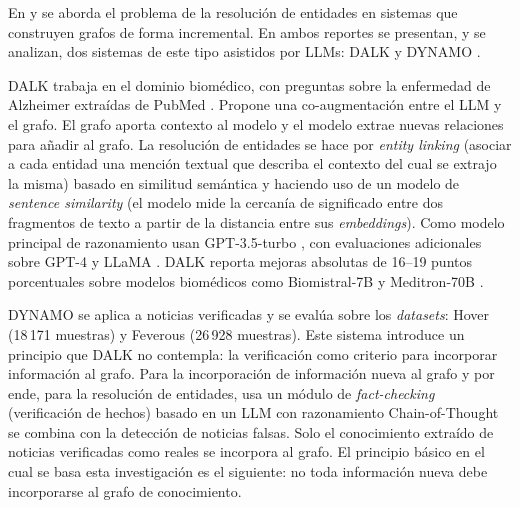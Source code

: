En \cite{dalk2024} y \cite{dynamo2025} se aborda el problema de la resolución de entidades en sistemas que construyen grafos de forma incremental. En ambos reportes se presentan, y se analizan, dos sistemas de este tipo asistidos por LLMs: DALK \cite{dalk2024} y DYNAMO \cite{dynamo2025}.

DALK trabaja en el dominio biomédico, con preguntas sobre la enfermedad de Alzheimer extraídas de PubMed \cite{pubmed}. Propone una co-augmentación entre el LLM y el grafo. El grafo aporta contexto al modelo y el modelo extrae nuevas relaciones para añadir al grafo. La resolución de entidades se hace por \emph{entity linking} \cite{sevgili2022neural} (asociar a cada entidad una mención textual que describa el contexto del cual se extrajo la misma) basado en similitud semántica y haciendo uso de un modelo de \emph{sentence similarity} \cite{reimers2019sbert} (el modelo mide la cercanía de significado entre dos fragmentos de texto a partir de la distancia entre sus \emph{embeddings}). Como modelo principal de razonamiento usan GPT-3.5-turbo \cite{openai2023gpt4}, con evaluaciones adicionales sobre GPT-4 \cite{openai2023gpt4} y LLaMA \cite{llama3_2024}. DALK reporta mejoras absolutas de 16--19 puntos porcentuales sobre modelos biomédicos como Biomistral-7B \cite{labrak2024biomistral} y Meditron-70B \cite{chen2023meditron}.

DYNAMO se aplica a noticias verificadas y se evalúa sobre los \emph{datasets}: Hover \cite{jiang2020hover} (18\,171 muestras) y Feverous \cite{aly2021feverous} (26\,928 muestras). Este sistema introduce un principio que DALK no contempla: la verificación como criterio para incorporar información al grafo. Para la incorporación de información nueva al grafo y por ende, para la resolución de entidades, usa un módulo de \emph{fact-checking} \cite{guo2022survey} (verificación de hechos) basado en un LLM con razonamiento Chain-of-Thought \cite{wei2022cot} se combina con la detección de noticias falsas. Solo el conocimiento extraído de noticias verificadas como reales se incorpora al grafo. El principio básico en el cual se basa esta investigación es el siguiente: no toda información nueva debe incorporarse al grafo de conocimiento.

